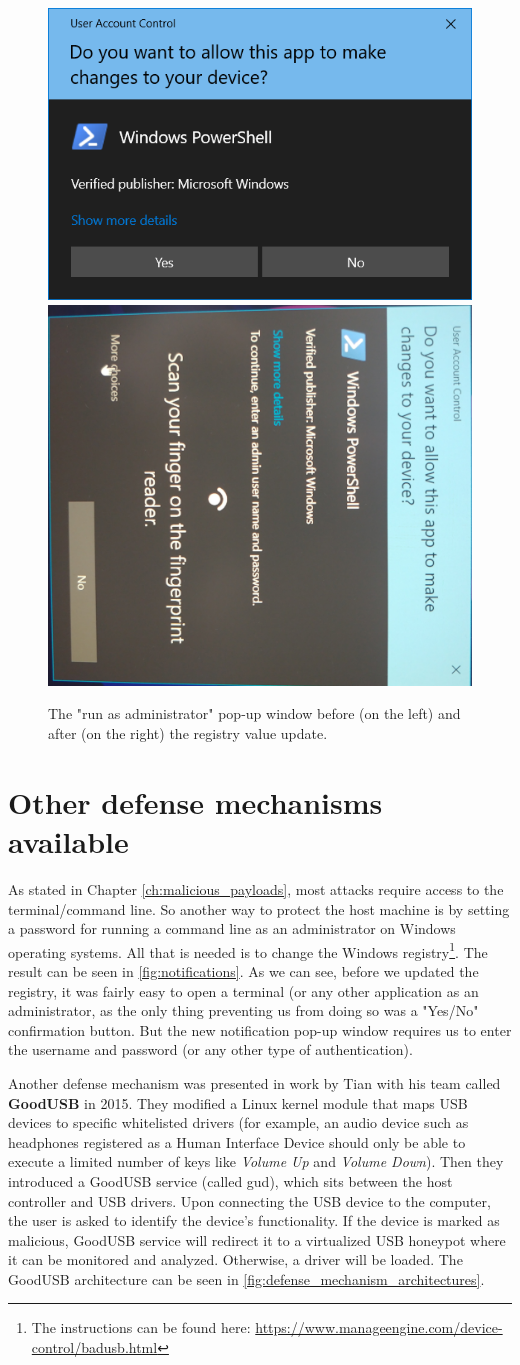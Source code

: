 \begin{figure}[ht]
    \centering
    \includegraphics[width=0.4\linewidth]{./obrazky-figures/basic_notification.PNG}
    \includegraphics[width=0.4\linewidth]{./obrazky-figures/notification_with_authentication.jpg}
    \caption{The "run as administrator" pop-up window before (on the left) and after (on the right) the registry value update.}
    \label{fig:notifications}
\end{figure}

\section{Other defense mechanisms available}
\label{sec:defense_other_strategies}
As stated in Chapter \ref{ch:malicious_payloads}, most attacks require access to the terminal/command line. So another way to protect the host machine is by setting a password for running a command line as an administrator on Windows operating systems. All that is needed is to change the Windows registry\footnote{The instructions can be found here: \url{https://www.manageengine.com/device-control/badusb.html}}. The result can be seen in \autoref{fig:notifications}. As we can see, before we updated the registry, it was fairly easy to open a terminal (or any other application as an administrator, as the only thing preventing us from doing so was a "Yes/No" confirmation button. But the new notification pop-up window requires us to enter the username and password (or any other type of authentication).

Another defense mechanism was presented in work \cite{goodusb} by Tian with his team called \textbf{GoodUSB} in 2015. They modified a Linux kernel module that maps USB devices to specific whitelisted drivers (for example, an audio device such as headphones registered as a Human Interface Device should only be able to execute a limited number of keys like \emph{Volume Up} and \emph{Volume Down}). Then they introduced a GoodUSB service (called gud), which sits between the host controller and USB drivers. Upon connecting the USB device to the computer, the user is asked to identify the device's functionality. If the device is marked as malicious, GoodUSB service will redirect it to a virtualized USB honeypot where it can be monitored and analyzed. Otherwise, a driver will be loaded. The GoodUSB architecture can be seen in \autoref{fig:defense_mechanism_architectures}.

